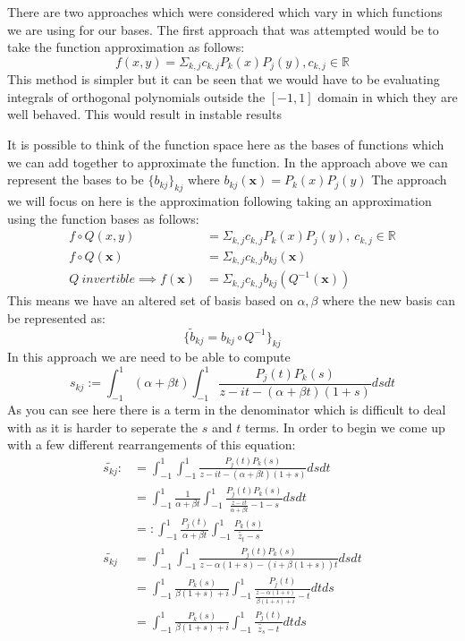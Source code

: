 \documentclass{article}
\begin{document}
There are two approaches which were considered which vary in which functions we are using for our bases.
The first approach that was attempted would be to take the function approximation as follows:
$$f(x,y)=\Sigma_{k,j}c_{k,j}P_k(x)P_j(y), c_{k,j}\in \mathbb{R}$$
This method is simpler but it can be seen that we would have to be evaluating integrals of orthogonal polynomials outside the
$[-1,1]$ domain in which they are well behaved.
This would result in instable results

It is possible to think of the function space here as the bases of functions which we can add together to approximate the function.
In the approach above we can represent the bases to be $\{b_{kj}\}_{kj}$ where $b_{kj}(\textbf{x})=P_k(x)P_j(y)$
The approach we will focus on here is the approximation following taking an approximation using the function bases as follows:
\begin{align}
    f\circ Q(x,y) &= \Sigma_{k,j}c_{k,j}P_k(x)P_j(y),\:c_{k,j}\in \mathbb{R}\\
    f\circ Q(\textbf{x})&=\Sigma_{k,j}c_{k,j}b_{kj}(\textbf{x})\\
    Q\:invertible \implies
    f(\textbf{x})&=\Sigma_{k,j}c_{k,j}b_{kj}(Q^{-1}(\textbf{x}))
\end{align}
This means we have an altered set of basis based on $\alpha,\beta$ where the new basis can be represented as:
$$\{\tilde{b}_{kj}=b_{kj}\circ Q^{-1}\}_{kj}$$
In this approach we are need to be able to compute $$s_{kj}:=\int_{-1}^1 (\alpha+\beta t) \int_{-1}^1 \frac{P_j(t)P_k(s)}
{z-it-(\alpha+\beta t)(1+s)} ds dt$$
As you can see here there is a term in the denominator which is difficult to deal with as it is harder to seperate the $s$ and $t$ terms.
In order to begin we come up with a few different rearrangements of this equation:
\begin{align}
\tilde{s_{kj}} :&= \int_{-1}^1 \int_{-1}^1 \frac{P_j(t)P_k(s)}
{z-it-(\alpha+\beta t)(1+s)} ds dt\\
&= \int_{-1}^1\frac{1}{\alpha+\beta t}\int_{-1}^1 \frac{P_j(t)P_k(s)}
{\frac{z-it}{\alpha+\beta t}-1-s}dsdt\\
&=: \int_{-1}^1\frac{P_j(t)}{\alpha+\beta t}\int_{-1}^1 \frac{P_k(s)}{\tilde{z_t}-s} \\
\tilde{s_{kj}} &= \int_{-1}^1\int_{-1}^1
\frac{P_j(t)P_k(s)}{z-\alpha(1+s)-(i+\beta(1+s))t}dsdt \\
&= \int_{-1}^1\frac{P_k(s)}{\beta(1+s)+i}\int_{-1}^1 \frac{P_j(t)}{
	\frac{z-\alpha(1+s)}{\beta(1+s)+i}-t}dtds\\
&= \int_{-1}^1\frac{P_k(s)}{\beta(1+s)+i}\int_{-1}^1 \frac{P_j(t)}{
\tilde{z_s}-t}dtds\\
\end{align}
\end{document}
